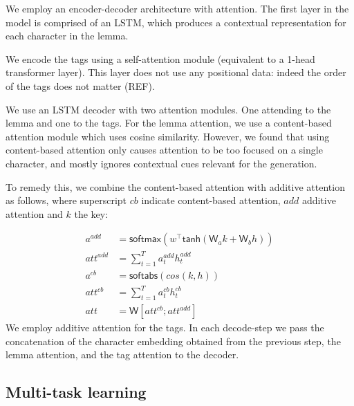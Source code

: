 \documentclass[11pt,a4paper]{article}
\newcommand\jp[1]{\textbf{JP: #1}}
\begin{document}
We employ an encoder-decoder architecture with attention. The first
layer in the model is comprised of an LSTM, which produces a
contextual representation for each character in the lemma.

We encode the tags using a self-attention module (equivalent to a
1-head transformer layer).  This layer does not use any positional
data: indeed the order of the tags does not matter (REF).

We use an LSTM decoder with two attention modules. One attending to
the lemma and one to the tags. For the lemma attention, we use a
content-based attention module \cite{graves2014neural,
karunaratne2021robust} which uses cosine similarity.  However, we
found that using content-based attention only causes attention to be
too focused on a single character, and mostly ignores contextual cues
relevant for the generation.

To remedy this, we combine the content-based attention with additive
attention as follows, where superscript $cb$ indicate content-based attention,
$add$ additive attention and $k$ the key:

\begin{align*}
	a^{add} & = \mathsf{softmax}(w^\top\mathsf{tanh}(\mathsf{W}_ak + \mathsf{W}_bh))\\
	att^{add} & = \sum_{t=1}^{T}a_t^{add}h_t^{add}\\
	a^{cb} & = \mathsf{softabs}(cos(k,h))\\
	att^{cb} & = \sum_{t=1}^{T}a_t^{cb}h_t^{cb}\\
	att & = \mathsf{W}[att^{cb}; att^{add}]
\end{align*}
We employ additive attention for the tags. In each decode-step we pass the
concatenation of the character embedding obtained from the previous
step, the lemma attention, and the tag attention to the decoder.


\subsection{Multi-task learning}
\end{document}
